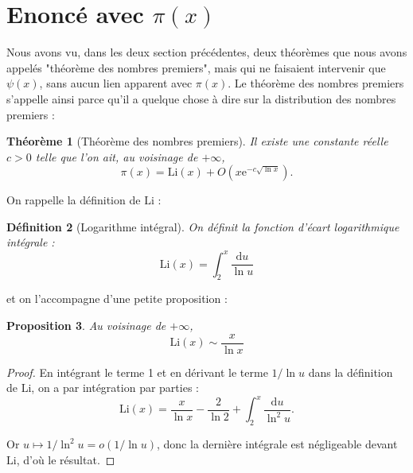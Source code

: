\documentclass[french]{report}
\newtheorem{theorem}{Théorème}[section]
\newtheorem{definition}[theorem]{Définition}
\newtheorem{proposition}[theorem]{Proposition}
\begin{document}
\section{Enoncé avec $\pi(x)$}

Nous avons vu, dans les deux section précédentes, deux théorèmes que nous avons appelés "théorème des nombres premiers", mais qui ne faisaient intervenir que $\psi(x)$, sans aucun lien apparent avec $\pi(x)$. Le théorème des nombres premiers s'appelle ainsi parce qu'il a quelque chose à dire sur la distribution des nombres premiers :

\begin{theorem}[Théorème des nombres premiers]\label{eq:tnp-pi-x}
  Il existe une constante réelle $c>0$ telle que l'on ait, au voisinage de $+\infty$,
  \[ \pi(x) = \mathrm{Li}(x) + O(x\mathrm{e}^{-c\sqrt{\ln x}}). \]
\end{theorem}

On rappelle la définition de $\mathrm{Li}$ :

\begin{definition}[Logarithme intégral] On définit la fonction d'écart logarithmique intégrale :
  \[
    \mathrm{Li}(x)
    = \int_2^x\frac{\mathrm{d}u}{\ln u}
  \]
\end{definition}

et on l'accompagne d'une petite proposition :

\begin{proposition}\label{prop:li-development-asymptotique}
  Au voisinage de $+\infty$,
  \[
    \mathrm{Li}(x)
    \sim \frac{x}{\ln x}
  \]
\end{proposition}

\begin{proof}
  En intégrant le terme 1 et en dérivant le terme $1/\ln u$ dans la définition de $\mathrm{Li}$, on a par intégration par parties :
  \begin{equation}\label{eq:li-ipp}
    \mathrm{Li}(x)=\frac{x}{\ln x}-\frac{2}{\ln2}+\int_2^x\frac{\mathrm{d}u}{\ln^2u}.
  \end{equation}

  Or $u\mapsto 1/\ln^2 u = o(1/\ln u)$, donc la dernière intégrale est négligeable devant $\mathrm{Li}$, d'où le résultat.
\end{proof}
\end{document}
